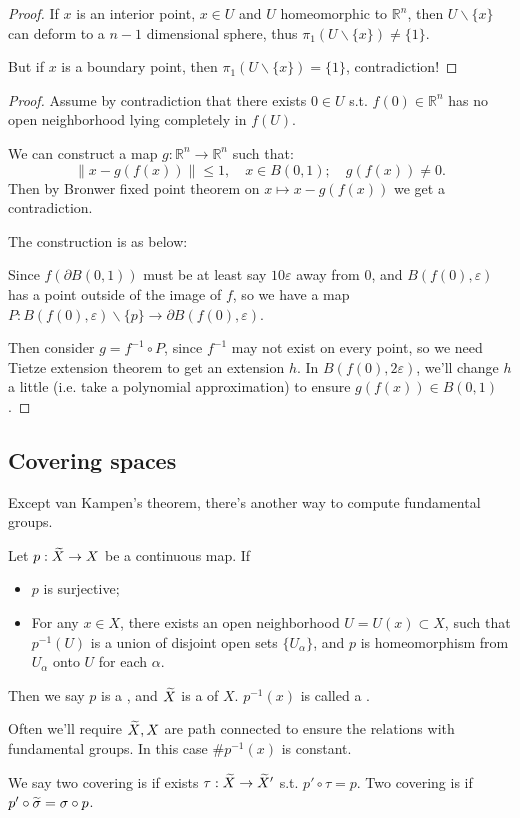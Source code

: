 \begin{proof}[Proof]
    If $x$ is an interior point, $x\in U$ and $U$ homeomorphic to $\mathbb{R}^{n}$,
	then $U \backslash \{x\}$ can deform to a $n-1$ dimensional sphere,
	thus $\pi_1(U\backslash\{x\}) \ne \{1\}$.

	But if $x$ is a boundary point, then $\pi_1(U \backslash\{x\}) = \{1\}$,
	contradiction!
\end{proof}

\begin{proof}[Proof]
    Assume by contradiction that there exists $0\in U$ s.t.
	$f(0)\in \mathbb{R}^{n}$ has no open neighborhood lying completely
	in $f(U)$.

	We can construct a map $g: \mathbb{R}^{n}\to \mathbb{R}^{n}$ such that:
	\[
	\lVert x - g(f(x)) \rVert \le 1,\quad x\in B(0, 1);
	\quad g(f(x)) \ne 0.
	\]
	Then by Bronwer fixed point theorem on $x\mapsto x - g(f(x))$
	we get a contradiction.

	The construction is as below:

	Since $f(\partial B(0, 1))$ must be at least say $10\varepsilon$ away from 0,
	and $B(f(0), \varepsilon)$ has a point outside of the image of $f$,
	so we have a map $P: B(f(0), \varepsilon)\backslash\{p\}\to
	\partial B(f(0), \varepsilon)$.

	Then consider $g = f^{-1}\circ P$, since $f^{-1}$ may not exist on every point,
	so we need Tietze extension theorem to get an extension $h$.
	In $B(f(0), 2\varepsilon)$, we'll change $h$ a little (i.e. take a
	polynomial approximation) to ensure $g(f(x)) \in B(0, 1)$.
\end{proof}

\subsection{Covering spaces}
\label{sub:Covering spaces}
Except van Kampen's theorem, there's another way to compute fundamental groups.
\begin{definition}
	Let $p: \widetilde{X} \to X$ be a continuous map. If
	\begin{itemize}
		\item $p$ is surjective;
		\item For any $x\in X$, there exists an open neighborhood $U=U(x) \subset X$,
			such that $p^{-1}(U)$ is a union of disjoint open sets $\{U_\alpha\}$,
			and $p$ is homeomorphism from $U_\alpha$ onto $U$ for each $\alpha$.
	\end{itemize}
	Then we say $p$ is a , and $\widetilde{X}$ is a
	 of $X$.
	$p^{-1}(x)$ is called a .
\end{definition}
\begin{remark}
    Often we'll require $\widetilde{X}, X$ are path connected to ensure the relations
	with fundamental groups. In this case $\# p^{-1}(x)$ is constant.
\end{remark}

\begin{definition}
	We say two covering is 
	if exists $\tau: \widetilde{X}\to \widetilde{X}'$ s.t. $p'\circ \tau = p$.
	Two covering is  if $p' \circ \widetilde{\sigma} = \sigma \circ p$.
\end{definition}
